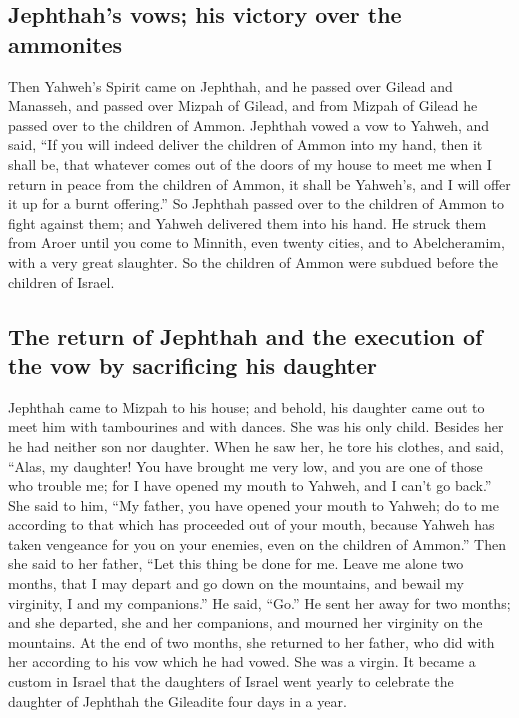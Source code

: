 \hypertarget{jephthahs-vows-his-victory-over-the-ammonites}{%
\subsection{Jephthah's vows; his victory over the
ammonites}\label{jephthahs-vows-his-victory-over-the-ammonites}}

 Then Yahweh's Spirit came on Jephthah, and he passed
over Gilead and Manasseh, and passed over Mizpah of Gilead, and from
Mizpah of Gilead he passed over to the children of Ammon.
 Jephthah vowed a vow to Yahweh, and said, ``If you will
indeed deliver the children of Ammon into my hand,  then
it shall be, that whatever comes out of the doors of my house to meet me
when I return in peace from the children of Ammon, it shall be Yahweh's,
and I will offer it up for a burnt offering.''  So
Jephthah passed over to the children of Ammon to fight against them; and
Yahweh delivered them into his hand.  He struck them from
Aroer until you come to Minnith, even twenty cities, and to
Abelcheramim, with a very great slaughter. So the children of Ammon were
subdued before the children of Israel.

\hypertarget{the-return-of-jephthah-and-the-execution-of-the-vow-by-sacrificing-his-daughter}{%
\subsection{The return of Jephthah and the execution of the vow by
sacrificing his
daughter}\label{the-return-of-jephthah-and-the-execution-of-the-vow-by-sacrificing-his-daughter}}

 Jephthah came to Mizpah to his house; and behold, his
daughter came out to meet him with tambourines and with dances. She was
his only child. Besides her he had neither son nor daughter.
 When he saw her, he tore his clothes, and said, ``Alas,
my daughter! You have brought me very low, and you are one of those who
trouble me; for I have opened my mouth to Yahweh, and I can't go back.''
 She said to him, ``My father, you have opened your mouth
to Yahweh; do to me according to that which has proceeded out of your
mouth, because Yahweh has taken vengeance for you on your enemies, even
on the children of Ammon.''  Then she said to her father,
``Let this thing be done for me. Leave me alone two months, that I may
depart and go down on the mountains, and bewail my virginity, I and my
companions.''  He said, ``Go.'' He sent her away for two
months; and she departed, she and her companions, and mourned her
virginity on the mountains.  At the end of two months,
she returned to her father, who did with her according to his vow which
he had vowed. She was a virgin. It became a custom in Israel
 that the daughters of Israel went yearly to celebrate
the daughter of Jephthah the Gileadite four days in a year.

